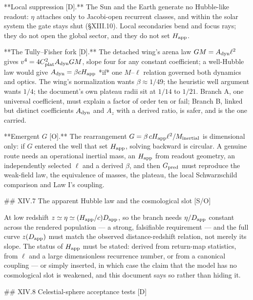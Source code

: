 **Local suppression [D].** The Sun and the Earth generate no Hubble-like readout: $\eta$ attaches only to Jacobi-open recurrent classes, and within the solar system the gate stays shut (§XIII.10). Local secondaries bend and focus rays; they do not open the global sector, and they do not set $H_{\rm app}$.

**The Tully–Fisher fork [D].** The detached wing's arena law $GM = A_{\rm dyn}\ell^2$ gives $v^4 = 4C_{\rm plat}^2A_{\rm dyn}GM$, slope four for any constant coefficient; a well-Hubble law would give $A_{\rm dyn} = \beta cH_{\rm app}$ *if* one $M$–$\ell$ relation governed both dynamics and optics. The wing's normalization wants $\beta\approx1/49$; the heuristic well argument wants $1/4$; the document's own plateau radii sit at $1/14$ to $1/21$. Branch A, one universal coefficient, must explain a factor of order ten or fail; Branch B, linked but distinct coefficients $A_{\rm dyn}$ and $A_z$ with a derived ratio, is safer, and is the one carried.

**Emergent $G$ [O].** The rearrangement $G = \beta\,cH_{\rm app}\ell^2/M_{\rm inertial}$ is dimensional only: if $G$ entered the well that set $H_{\rm app}$, solving backward is circular. A genuine route needs an operational inertial mass, an $H_{\rm app}$ from readout geometry, an independently selected $\ell$ and a derived $\beta$, and then $G_{\rm pred}$ must reproduce the weak-field law, the equivalence of masses, the plateau, the local Schwarzschild comparison and Law I's coupling.

## XIV.7 The apparent Hubble law and the cosmological slot [S/O]

At low redshift $z\simeq\eta\simeq(H_{\rm app}/c)D_{\rm app}$, so the branch needs $\eta/D_{\rm app}$ constant across the rendered population — a strong, falsifiable requirement — and the full curve $z(D_{\rm app})$ must match the observed distance-redshift relation, not merely its slope. The status of $H_{\rm app}$ must be stated: derived from return-map statistics, from $\ell$ and a large dimensionless recurrence number, or from a canonical coupling — or simply inserted, in which case the claim that the model has no cosmological slot is weakened, and this document says so rather than hiding it.

## XIV.8 Celestial-sphere acceptance tests [D]

